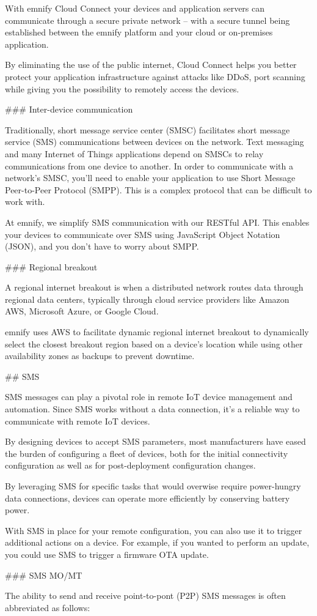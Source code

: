 \documentclass[11pt, oneside]{article}   	%
\begin{document}
\begin{markdown}

With emnify Cloud Connect your devices and application servers can communicate through a secure private network -- with a secure tunnel being established between the emnify platform and your cloud or on-premises application.

By eliminating the use of the public internet, Cloud Connect helps you better protect your application infrastructure against attacks like DDoS, port scanning while giving you the possibility to remotely access the devices.

### Inter-device communication

Traditionally, short message service center (SMSC) facilitates short message service (SMS) communications between devices on the network.
Text messaging and many Internet of Things applications depend on SMSCs to relay communications from one device to another.
In order to communicate with a network's SMSC, you'll need to enable your application to use Short Message Peer-to-Peer Protocol (SMPP).
This is a complex protocol that can be difficult to work with.

At emnify, we simplify SMS communication with our RESTful API.
This enables your devices to communicate over SMS using JavaScript Object Notation (JSON), and you don't have to worry about SMPP.

### Regional breakout

A regional internet breakout is when a distributed network routes data through regional data centers, typically through cloud service providers like Amazon AWS, Microsoft Azure, or Google Cloud.

emnify uses AWS to facilitate dynamic regional internet breakout to dynamically select the closest breakout region based on a device's location while using other availability zones as backups to prevent downtime.

## SMS

SMS messages can play a pivotal role in remote IoT device management and automation.
Since SMS works without a data connection, it's a reliable way to communicate with remote IoT devices.

By designing devices to accept SMS parameters, most manufacturers have eased the burden of configuring a fleet of devices, both for the initial connectivity configuration as well as for post-deployment configuration changes.

By leveraging SMS for specific tasks that would overwise require power-hungry data connections, devices can operate more efficiently by conserving battery power.

With SMS in place for your remote configuration, you can also use it to trigger additional actions on a device.
For example, if you wanted to perform an update, you could use SMS to trigger a firmware OTA update.

### SMS MO/MT

The ability to send and receive point-to-pont (P2P) SMS messages is often abbreviated as follows:

\end{markdown}
\end{document}
